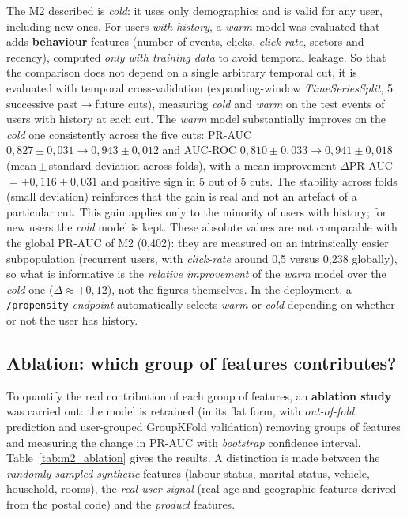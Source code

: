 The M2 described is \emph{cold}: it uses only demographics and is valid for any user, including new ones. For users \emph{with history}, a \emph{warm} model was evaluated that adds \textbf{behaviour} features (number of events, clicks, \textit{click-rate}, sectors and recency), computed \emph{only with training data} to avoid temporal leakage. So that the comparison does not depend on a single arbitrary temporal cut, it is evaluated with temporal cross-validation (expanding-window \textit{TimeSeriesSplit}, 5 successive past$\to$future cuts), measuring \emph{cold} and \emph{warm} on the test events of users with history at each cut. The \emph{warm} model substantially improves on the \emph{cold} one consistently across the five cuts: PR-AUC $0{,}827\pm0{,}031 \to 0{,}943\pm0{,}012$ and AUC-ROC $0{,}810\pm0{,}033 \to 0{,}941\pm0{,}018$ (mean\,$\pm$\,standard deviation across folds), with a mean improvement $\Delta$PR-AUC $=+0{,}116\pm0{,}031$ and positive sign in 5 out of 5 cuts. The stability across folds (small deviation) reinforces that the gain is real and not an artefact of a particular cut. This gain applies only to the minority of users with history; for new users the \emph{cold} model is kept. These absolute values are not comparable with the global PR-AUC of M2 (0,402): they are measured on an intrinsically easier subpopulation (recurrent users, with \textit{click-rate} around 0,5 versus 0,238 globally), so what is informative is the \emph{relative improvement} of the \emph{warm} model over the \emph{cold} one ($\Delta\approx+0{,}12$), not the figures themselves. In the deployment, a \texttt{/propensity} \textit{endpoint} automatically selects \emph{warm} or \emph{cold} depending on whether or not the user has history.

\subsection{Ablation: which group of features contributes?}

To quantify the real contribution of each group of features, an \textbf{ablation study} was carried out: the model is retrained (in its flat form, with \textit{out-of-fold} prediction and user-grouped GroupKFold validation) removing groups of features and measuring the change in PR-AUC with \textit{bootstrap} confidence interval. Table~\ref{tab:m2_ablation} gives the results. A distinction is made between the \emph{randomly sampled synthetic} features (labour status, marital status, vehicle, household, rooms), the \emph{real user signal} (real age and geographic features derived from the postal code) and the \emph{product} features.

